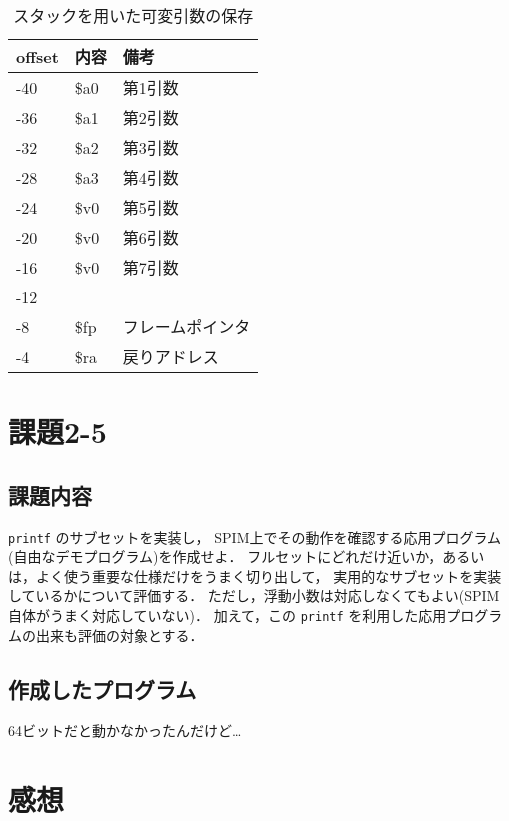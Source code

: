 \documentclass[a4j,11pt]{jarticle}
\begin{document}
\begin{table}[]
      \centering
      \caption{スタックを用いた可変引数の保存}
      \label{tbl:2-4}
      \begin{tabular}{|l|l|l|}
      \hline
      offset & 内容   & 備考   \\ \hline
      -40    & \$a0 & 第1引数 \\ \hline
      -36    & \$a1 & 第2引数 \\ \hline
      -32    & \$a2 & 第3引数 \\ \hline
      -28    & \$a3 & 第4引数 \\ \hline
      -24    & \$v0 & 第5引数 \\ \hline
      -20    & \$v0 & 第6引数 \\ \hline
      -16    & \$v0 & 第7引数 \\ \hline
      -12    &      &      \\ \hline
      -8     & \$fp & フレームポインタ \\ \hline
      -4     & \$ra & 戻りアドレス \\ \hline
      \end{tabular}
      \end{table}

\section{課題2-5}

\subsection{課題内容}

{\tt printf} のサブセットを実装し， SPIM上でその動作を確認する応用プログラム(自由なデモプログラム)を作成せよ． 
フルセットにどれだけ近いか，あるいは，よく使う重要な仕様だけをうまく切り出して， 
実用的なサブセットを実装しているかについて評価する． 
ただし，浮動小数は対応しなくてもよい(SPIM自体がうまく対応していない)． 
加えて，この {\tt printf} を利用した応用プログラムの出来も評価の対象とする．


\subsection{作成したプログラム}

64ビットだと動かなかったんだけど…



\section{感想}
\end{document}
